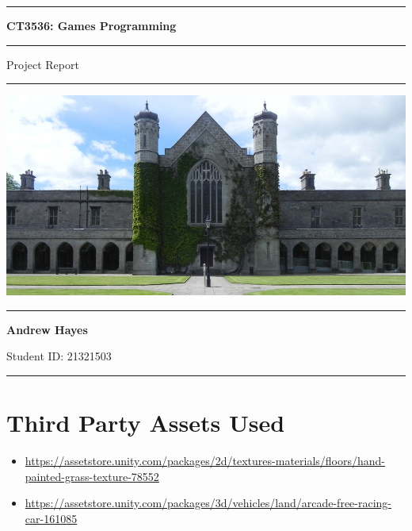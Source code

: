 \documentclass[a4paper,11pt]{article}
\author{Andreas Ó hAodha}
\begin{document}
\begin{titlepage}
    \begin{center}
        \hrule
        \vspace*{0.6cm}
        \huge \textbf{CT3536: Games Programming}
        \vspace*{0.6cm}
        \hrule
        \LARGE
       \vspace{0.5cm}
       Project Report
       \vspace{0.5cm}
       \hrule
            
       \vfill
       \includegraphics[width=\textwidth]{images/uniog.jpg}
        \vfill

        \Large
       \vspace{0.5cm}
       \hrule
       \vspace{0.5cm}
       \textbf{Andrew Hayes}
            
       \normalsize
       Student ID: 21321503


       \vspace{0.5cm}
       \hrule
    \end{center}
\end{titlepage}

\newpage
\tableofcontents
\newpage
\setcounter{page}{1}

\section{Third Party Assets Used}
\begin{itemize}
    \item   \url{https://assetstore.unity.com/packages/2d/textures-materials/floors/hand-painted-grass-texture-78552}
    \item   \url{https://assetstore.unity.com/packages/3d/vehicles/land/arcade-free-racing-car-161085}
\end{itemize}
\end{document}
